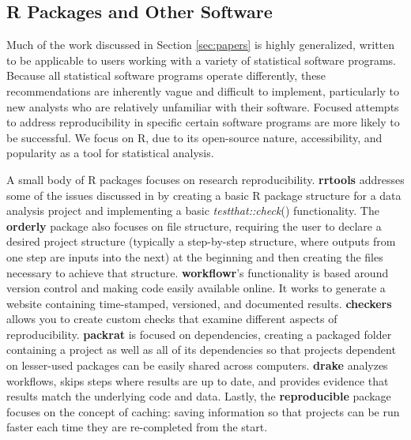 \documentclass[APA,LATO1COL]{WileyNJD-v2}\usepackage[]{graphicx}\usepackage[]{color}
\newcommand{\R}{\textsf{R}\xspace}
\newcommand{\pkg}[1]{\textbf{#1}}
\newcommand{\func}[1]{\textit{#1}()}
\begin{document}
\subsection{R Packages and Other Software}

Much of the work discussed in Section \ref{sec:papers} is highly generalized, written to be applicable to users working with a variety of statistical software programs. Because all statistical software programs operate differently, these recommendations are inherently vague and difficult to implement, particularly to new analysts who are relatively unfamiliar with their software. Focused attempts to address reproducibility in specific certain software programs are more likely to be successful. We focus on \R, due to its open-source nature, accessibility, and popularity as a tool for statistical analysis.

A small body of \R packages focuses on research reproducibility. \pkg{rrtools} \citep{R-rrtools} addresses some of the issues discussed in \citet{marwick2018packaging} by creating a basic \R package structure for a data analysis project and implementing a basic \func{testthat::check} functionality. The \pkg{orderly} \citep{R-orderly} package also focuses on file structure, requiring the user to declare a desired project structure (typically a step-by-step structure, where outputs from one step are inputs into the next) at the beginning and then creating the files necessary to achieve that structure. \pkg{workflowr}'s \citep{R-workflowr} functionality is based around version control and making code easily available online. It works to generate a website containing time-stamped, versioned, and documented results. \pkg{checkers} \citep{R-checkers} allows you to create custom checks that examine different aspects of reproducibility. \pkg{packrat} \citep{R-packrat} is focused on dependencies, creating a packaged folder containing a project as well as all of its dependencies so that projects dependent on lesser-used packages can be easily shared across computers. \pkg{drake} \citep{R-drake} analyzes workflows, skips steps where results are up to date, and provides evidence that results match the underlying code and data. Lastly, the \pkg{reproducible} \citep{R-reproducible} package focuses on the concept of caching: saving information so that projects can be run faster each time they are re-completed from the start.
\end{document}
